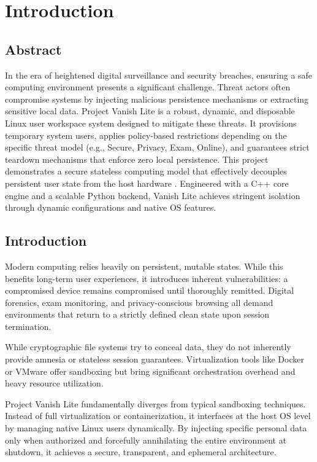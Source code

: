 \chapter{Introduction}

\section{Abstract}
In the era of heightened digital surveillance and security breaches, ensuring a safe computing environment presents a significant challenge. Threat actors often compromise systems by injecting malicious persistence mechanisms or extracting sensitive local data. Project Vanish Lite is a robust, dynamic, and disposable Linux user workspace system designed to mitigate these threats. It provisions temporary system users, applies policy-based restrictions depending on the specific threat model (e.g., Secure, Privacy, Exam, Online), and guarantees strict teardown mechanisms that enforce zero local persistence. This project demonstrates a secure stateless computing model that effectively decouples persistent user state from the host hardware . Engineered with a C++ core engine and a scalable Python backend, Vanish Lite achieves stringent isolation through dynamic configurations and native OS features.

\section{Introduction}
Modern computing relies heavily on persistent, mutable states. While this benefits long-term user experiences, it introduces inherent vulnerabilities: a compromised device remains compromised until thoroughly remitted. Digital forensics, exam monitoring, and privacy-conscious browsing all demand environments that return to a strictly defined clean state upon session termination.

While cryptographic file systems try to conceal data, they do not inherently provide amnesia or stateless session guarantees. Virtualization tools like Docker or VMware offer sandboxing but bring significant orchestration overhead and heavy resource utilization. 

Project Vanish Lite fundamentally diverges from typical sandboxing techniques. Instead of full virtualization or containerization, it interfaces at the host OS level by managing native Linux users dynamically. By injecting specific personal data only when authorized and forcefully annihilating the entire environment at shutdown, it achieves a secure, transparent, and ephemeral architecture.

